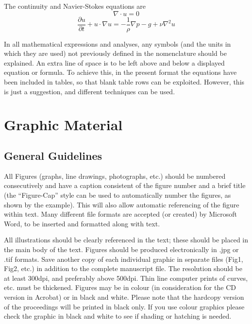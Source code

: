\documentclass{stabs2021}
\begin{document}
The continuity and Navier-Stokes equations are
\begin{equation}
  \nabla\cdot u = 0
\end{equation}
\begin{equation}
  \frac{\partial u}{\partial t} + u\cdot \nabla u = -\frac1\rho \nabla p - g + \nu \nabla^2 u
\end{equation}

In all mathematical expressions and analyses, any symbols (and the
units in which they are used) not previously defined in the
nomenclature should be explained. An extra line of space is to be
left above and below a displayed equation or formula. To achieve this,
in the present format the equations have been included in tables, so
that blank table rows can be exploited. However, this is just a
suggestion, and different techniques can be used.

\section{Graphic Material}

\subsection{General Guidelines}

All Figures (graphs, line drawings, photographs, etc.) should be
numbered consecutively and have a caption consistent of the figure
number and a brief title (the “Figure-Cap” style can be used to
automatically number the figures, as shown by the example). This will
also allow automatic referencing of the figure within text. Many
different file formats are accepted (or created) by Microsoft Word,
to be inserted and formatted along with text.

All illustrations should be clearly referenced in the text; these
should be placed in the main body of the text.  Figures should be
produced electronically in .jpg or .tif formats. Save another copy of
each individual graphic in separate files (Fig1, Fig2, etc.) in
addition to the complete manuscript file. The resolution should be at
least 300dpi, and preferably above 500dpi. Thin line computer prints
of curves, etc. must be thickened. Figures may be in colour (in
consideration for the CD version in Acrobat) or in black and
white. Please note that the hardcopy version of the proceedings will
be printed in black only. If you use colour graphics please check the
graphic in black and white to see if shading or hatching is needed.
\end{document}
